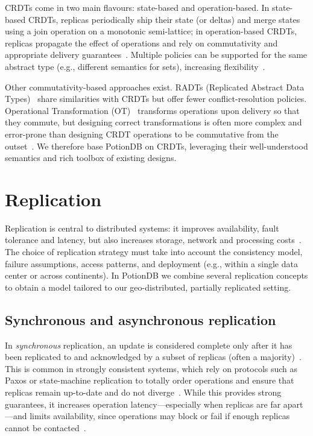 CRDTs come in two main flavours: state-based and operation-based. In state-based
CRDTs, replicas periodically ship their state (or deltas) and merge states using
a join operation on a monotonic semi-lattice; in operation-based CRDTs, replicas
propagate the effect of operations and rely on commutativity and appropriate
delivery guarantees~\cite{crdt,stateCRDT}. Multiple
policies can be supported for the same abstract type (e.g., different semantics
for sets), increasing flexibility~\cite{crdt}.

Other commutativity-based approaches exist. RADTs (Replicated Abstract Data
Types)~\cite{preguicarpadt} share similarities with CRDTs but offer fewer
conflict-resolution policies. Operational Transformation (OT)~\cite{ot,otCorrectness}
transforms operations upon delivery so that they commute, but designing correct
transformations is often more complex and error-prone than designing CRDT
operations to be commutative from the outset~\cite{crdt}. We
therefore base PotionDB on CRDTs, leveraging their well-understood semantics and
rich toolbox of existing designs.

\section{Replication}
\label{sec:replication}

Replication is central to distributed systems: it improves availability, fault
tolerance and latency, but also increases storage, network and processing
costs~\cite{abbadi1990faulttolerant,dynamo}. The choice of replication
strategy must take into account the consistency model, failure assumptions,
access patterns, and deployment (e.g., within a single data center or across
continents). In PotionDB we combine several replication concepts to obtain a
model tailored to our geo-distributed, partially replicated setting.

\subsection{Synchronous and asynchronous replication}

In \emph{synchronous} replication, an update is considered complete only after it
has been replicated to and acknowledged by a subset of replicas (often a
majority)~\cite{tanenbaum2006distributed}. This is common in strongly consistent
systems, which rely on protocols such as Paxos or state-machine replication to
totally order operations and ensure that replicas remain up-to-date and do not
diverge~\cite{paxos,schneider1990implementing,spanner}. While this
provides strong guarantees, it increases operation latency—especially when
replicas are far apart—and limits availability, since operations may block or
fail if enough replicas cannot be contacted~\cite{spanner,bailis2013eventually}.


